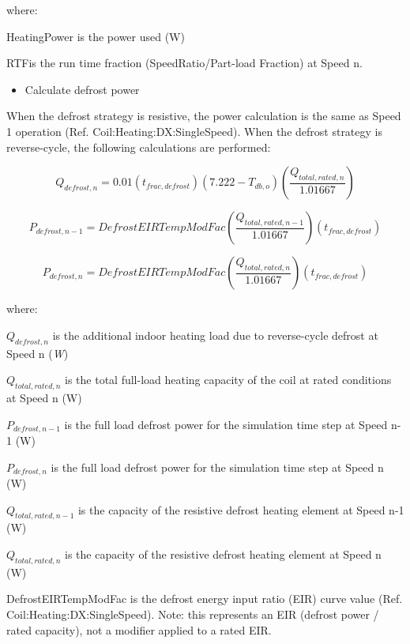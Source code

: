 where:

HeatingPower is the power used (W)

RTFis the run time fraction (SpeedRatio/Part-load Fraction) at Speed n.

\begin{itemize}
  \item Calculate defrost power
\end{itemize}

When the defrost strategy is resistive, the power calculation is the same as Speed 1 operation (Ref. Coil:Heating:DX:SingleSpeed). When the defrost strategy is reverse-cycle, the following calculations are performed:

\begin{equation}
{Q_{defrost,n}} = 0.01({t_{frac,defrost}})(7.222 - {T_{db,o}})\left( {\frac{{{Q_{total,rated,n}}}}{{1.01667}}} \right)
\end{equation}

\begin{equation}
{P_{defrost,n - 1}} = DefrostEIRTempModFac\left( {\frac{{{Q_{total,rated,n - 1}}}}{{1.01667}}} \right)({t_{frac,defrost}})
\end{equation}

\begin{equation}
{P_{defrost,n}} = DefrostEIRTempModFac\left( {\frac{{{Q_{total,rated,n}}}}{{1.01667}}} \right)({t_{frac,defrost}})
\end{equation}

where:

\({Q_{defrost,n}}\) is the additional indoor heating load due to reverse-cycle defrost at Speed n (\emph{W})

\({Q_{total,rated,n}}\) is the total full-load heating capacity of the coil at rated conditions at Speed n (W)

\({P_{defrost,n - 1}}\) is the full load defrost power for the simulation time step at Speed n-1 (W)

\({P_{defrost,n}}\) is the full load defrost power for the simulation time step at Speed n (W)

\({Q_{total,rated,n - 1}}\) is the capacity of the resistive defrost heating element at Speed n-1 (W)

\({Q_{total,rated,n}}\) is the capacity of the resistive defrost heating element at Speed n (W)

DefrostEIRTempModFac is the defrost energy input ratio (EIR) curve value (Ref. Coil:Heating:DX:SingleSpeed). Note: this represents an EIR (defrost power / rated capacity), not a modifier applied to a rated EIR.

